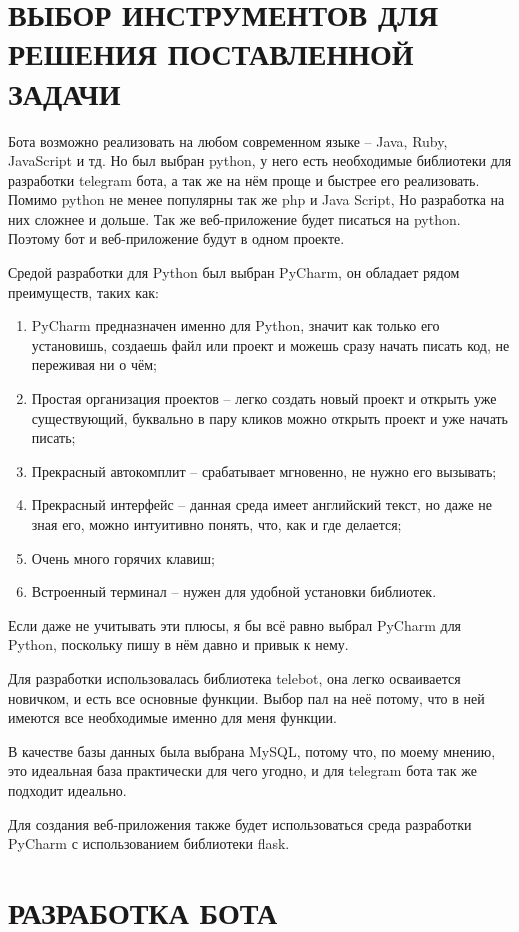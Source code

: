 \documentclass[12pt, oldlfont, amsfonts]{report}
\begin{document}
\chapter{\large{ВЫБОР ИНСТРУМЕНТОВ ДЛЯ РЕШЕНИЯ ПОСТАВЛЕННОЙ ЗАДАЧИ}}
Бота возможно реализовать на любом современном языке – Java, Ruby, JavaScript и тд. Но был выбран python, у него есть необходимые библиотеки для разработки telegram бота, а так же на нём проще и быстрее его реализовать. Помимо python не менее популярны так же php и Java Script, Но разработка на них сложнее и дольше. Так же веб-приложение будет писаться на python. Поэтому бот и веб-приложение будут в одном проекте.
	
Средой разработки для Python был выбран PyCharm, он обладает рядом преимуществ, таких как:
\begin{enumerate}
\item PyCharm предназначен именно для Python, значит как только его установишь, создаешь файл или проект и можешь сразу начать писать код, не переживая ни о чём;
\item Простая организация проектов – легко создать новый проект и открыть уже существующий, буквально в пару кликов можно открыть проект и уже начать писать;
\item Прекрасный автокомплит – срабатывает мгновенно, не нужно его вызывать;
\item Прекрасный интерфейс – данная среда имеет английский текст, но даже не зная его, можно интуитивно понять, что, как и где делается;
\item Очень много горячих клавиш;
\item Встроенный терминал – нужен для удобной установки библиотек.
\end{enumerate}	

Если даже не учитывать эти плюсы, я бы всё равно выбрал PyCharm для Python, поскольку пишу в нём давно и привык к нему.

Для разработки использовалась библиотека telebot, она легко осваивается новичком, и есть все основные функции. Выбор пал на неё потому, что в ней имеются все необходимые именно для меня функции.

В качестве базы данных была выбрана MySQL, потому что, по моему мнению, это идеальная база практически для чего угодно, и для telegram бота так же подходит идеально.

Для создания веб-приложения также будет использоваться среда разработки PyCharm с использованием библиотеки flask.

\chapter{\large{РАЗРАБОТКА БОТА}}
\end{document}
